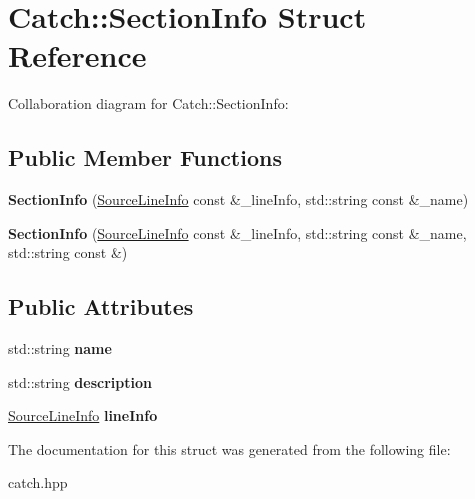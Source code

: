 \hypertarget{structCatch_1_1SectionInfo}{}\section{Catch\+:\+:Section\+Info Struct Reference}
\label{structCatch_1_1SectionInfo}


Collaboration diagram for Catch\+:\+:Section\+Info\+:
\subsection*{Public Member Functions}
\begin{DoxyCompactItemize}
\item 
{\bfseries Section\+Info} (\hyperlink{structCatch_1_1SourceLineInfo}{Source\+Line\+Info} const \&\+\_\+line\+Info, std\+::string const \&\+\_\+name)\hypertarget{structCatch_1_1SectionInfo_a2808437ae7d4bc0830cee1c3995165a6}{}\label{structCatch_1_1SectionInfo_a2808437ae7d4bc0830cee1c3995165a6}

\item 
{\bfseries Section\+Info} (\hyperlink{structCatch_1_1SourceLineInfo}{Source\+Line\+Info} const \&\+\_\+line\+Info, std\+::string const \&\+\_\+name, std\+::string const \&)\hypertarget{structCatch_1_1SectionInfo_a139875f2e7bd12a5898a948f8bad15b3}{}\label{structCatch_1_1SectionInfo_a139875f2e7bd12a5898a948f8bad15b3}

\end{DoxyCompactItemize}
\subsection*{Public Attributes}
\begin{DoxyCompactItemize}
\item 
std\+::string {\bfseries name}\hypertarget{structCatch_1_1SectionInfo_a704c8fc662d309137e0d4f199cb7df58}{}\label{structCatch_1_1SectionInfo_a704c8fc662d309137e0d4f199cb7df58}

\item 
std\+::string {\bfseries description}\hypertarget{structCatch_1_1SectionInfo_a0052060219a6de74bb7ade34d4163a4e}{}\label{structCatch_1_1SectionInfo_a0052060219a6de74bb7ade34d4163a4e}

\item 
\hyperlink{structCatch_1_1SourceLineInfo}{Source\+Line\+Info} {\bfseries line\+Info}\hypertarget{structCatch_1_1SectionInfo_adbc83b8a3507c4acc8ee249e93465711}{}\label{structCatch_1_1SectionInfo_adbc83b8a3507c4acc8ee249e93465711}

\end{DoxyCompactItemize}


The documentation for this struct was generated from the following file\+:\begin{DoxyCompactItemize}
\item 
catch.\+hpp\end{DoxyCompactItemize}
